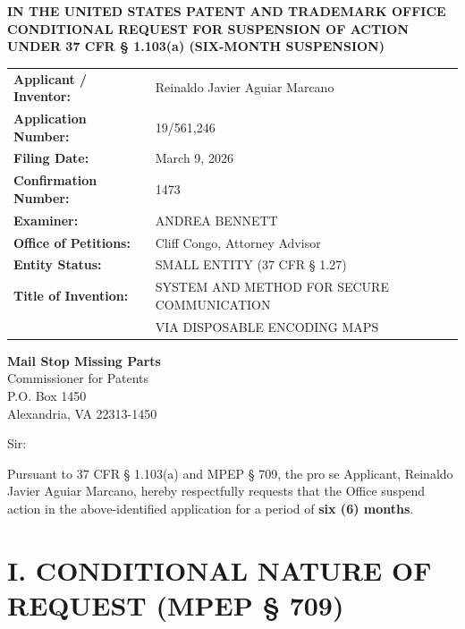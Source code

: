 \documentclass[11pt,letterpaper]{article}
\begin{document}
\thispagestyle{empty}

\begin{center}
    \textbf{\large IN THE UNITED STATES PATENT AND TRADEMARK OFFICE} \\
    \vspace{0.3cm}
    \textbf{\large CONDITIONAL REQUEST FOR SUSPENSION OF ACTION} \\
    \textbf{\normalsize UNDER 37 CFR \S{} 1.103(a) (SIX-MONTH SUSPENSION)}
\end{center}

\vspace{0.4cm}
\noindent\begin{tabular}{p{2.3in}p{4.0in}}
\textbf{Applicant / Inventor:} & Reinaldo Javier Aguiar Marcano \\
\textbf{Application Number:} & 19/561,246 \\
\textbf{Filing Date:} & March 9, 2026 \\
\textbf{Confirmation Number:} & 1473 \\
\textbf{Examiner:} & ANDREA BENNETT \\
\textbf{Office of Petitions:} & Cliff Congo, Attorney Advisor \\
\textbf{Entity Status:} & SMALL ENTITY (37 CFR \S{} 1.27) \\
\textbf{Title of Invention:} & SYSTEM AND METHOD FOR SECURE COMMUNICATION \\
& VIA DISPOSABLE ENCODING MAPS \\
\end{tabular}

\vspace{0.5cm}
\noindent\textbf{Mail Stop Missing Parts} \\
Commissioner for Patents \\
P.O. Box 1450 \\
Alexandria, VA 22313-1450

\vspace{0.2cm}
Sir:

Pursuant to 37 CFR \S{} 1.103(a) and MPEP \S{} 709, the pro se Applicant, Reinaldo Javier Aguiar Marcano, hereby respectfully requests that the Office suspend action in the above-identified application for a period of \textbf{six (6) months}.

\section*{I. CONDITIONAL NATURE OF REQUEST (MPEP \S{} 709)}
\end{document}
